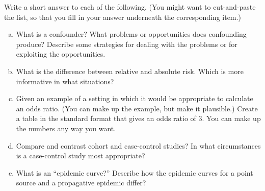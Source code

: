 Write a short answer to each of the following.  (You might want to cut-and-paste the list, so that you fill in your answer underneath the corresponding item.) 

\begin{enumerate}[(a)]
\item What is a confounder?  What problems or opportunities does confounding produce?  Describe some strategies for dealing with the problems or for exploiting the opportunities.

\TextEntry[itemname=dt104-confounder]

\item What is the difference between relative and absolute risk.  Which is more informative in what situations?

\TextEntry[itemname=dt104-risk]


\item Given an example of a setting in which it would be appropriate to calculate an odds ratio.  (You can make up the example, but make it plausible.)  Create a table in the standard format that gives an odds ratio of 3.  You can make up the numbers any way you want.

\TextEntry[itemname=dt104-odds]


\item Compare and contrast cohort and case-control studies?  In what circumstances is a 
case-control study most appropriate? 

\TextEntry[itemname=dt104-cohort]

\item What is an ``epidemic curve?''  Describe how the epidemic curves for a point source and a propagative epidemic differ?

\TextEntry[itemname=dt104-epidemic]

\end{enumerate}
